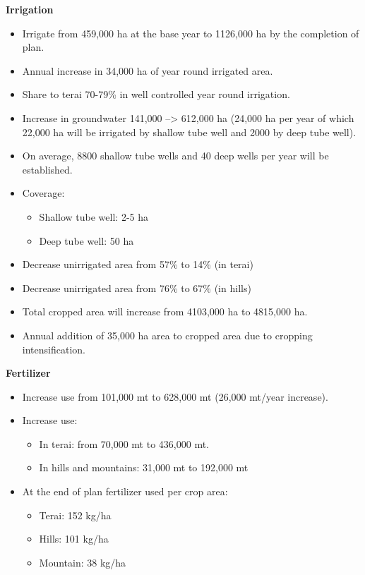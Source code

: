 \documentclass[
  openany]{book}
\providecommand{\tightlist}{%
  \setlength{\itemsep}{0pt}\setlength{\parskip}{0pt}}
\begin{document}
\textbf{Irrigation}

\begin{itemize}
\tightlist
\item
  Irrigate from 459,000 ha at the base year to 1126,000 ha by the completion of plan.
\item
  Annual increase in 34,000 ha of year round irrigated area.
\item
  Share to terai 70-79\% in well controlled year round irrigation.
\item
  Increase in groundwater 141,000 --\textgreater{} 612,000 ha (24,000 ha per year of which 22,000 ha will be irrigated by shallow tube well and 2000 by deep tube well).
\item
  On average, 8800 shallow tube wells and 40 deep wells per year will be established.
\item
  Coverage:

  \begin{itemize}
  \tightlist
  \item
    Shallow tube well: 2-5 ha
  \item
    Deep tube well: 50 ha
  \end{itemize}
\item
  Decrease unirrigated area from 57\% to 14\% (in terai)
\item
  Decrease unirrigated area from 76\% to 67\% (in hills)
\item
  Total cropped area will increase from 4103,000 ha to 4815,000 ha.
\item
  Annual addition of 35,000 ha area to cropped area due to cropping intensification.
\end{itemize}

\textbf{Fertilizer}

\begin{itemize}
\tightlist
\item
  Increase use from 101,000 mt to 628,000 mt (26,000 mt/year increase).
\item
  Increase use:

  \begin{itemize}
  \tightlist
  \item
    In terai: from 70,000 mt to 436,000 mt.
  \item
    In hills and mountains: 31,000 mt to 192,000 mt
  \end{itemize}
\item
  At the end of plan fertilizer used per crop area:

  \begin{itemize}
  \tightlist
  \item
    Terai: 152 kg/ha
  \item
    Hills: 101 kg/ha
  \item
    Mountain: 38 kg/ha
  \end{itemize}
\end{itemize}
\end{document}
